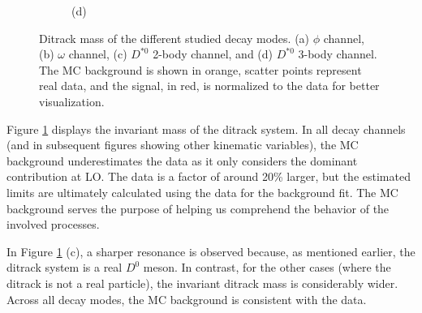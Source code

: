 \begin{figure}[!ht]
\begin{subfigure}[t]{0.50\mylength}
        \caption{\footnotesize (d)}
    \end{subfigure}%
\caption{Ditrack mass of the different studied decay modes. (a) $\phi$ channel, (b) $\omega$ channel, (c) $D^{*0}$ 2-body channel, and (d) $D^{*0}$ 3-body channel. The MC background is shown in orange, scatter points represent real data, and the signal, in red, is normalized to the data for better visualization.}
\label{fig:ditrack_mass_data}
    \vspace*{-0.0cm}
\end{figure}

Figure \ref{fig:ditrack_mass_data} displays the invariant mass of the ditrack system. In all decay channels (and in subsequent figures showing other kinematic variables), the MC background underestimates the data as it only considers the dominant contribution at LO. The data is a factor of around 20\% larger, but the estimated limits are ultimately calculated using the data for the background fit. The MC background serves the purpose of helping us comprehend the behavior of the involved processes.

In Figure \ref{fig:ditrack_mass_data} (c), a sharper resonance is observed because, as mentioned earlier, the ditrack system is a real $D^{0}$ meson. In contrast, for the other cases (where the ditrack is not a real particle), the invariant ditrack mass is considerably wider. Across all decay modes, the MC background is consistent with the data.

